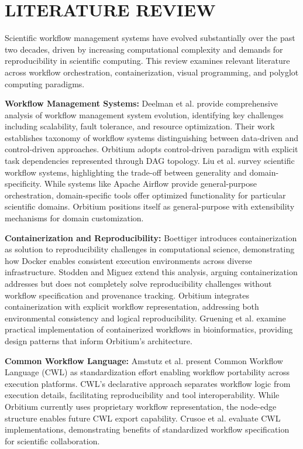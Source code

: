 \documentclass[12pt]{article}
\begin{document}
\newpage
\section{LITERATURE REVIEW}

\hspace{\parindent}Scientific workflow management systems have evolved substantially over the past two decades, driven by increasing computational complexity and demands for reproducibility in scientific computing. This review examines relevant literature across workflow orchestration, containerization, visual programming, and polyglot computing paradigms.

\hspace{\parindent}\textbf{Workflow Management Systems:} Deelman et al. \cite{deelman2015future} provide comprehensive analysis of workflow management system evolution, identifying key challenges including scalability, fault tolerance, and resource optimization. Their work establishes taxonomy of workflow systems distinguishing between data-driven and control-driven approaches. Orbitium adopts control-driven paradigm with explicit task dependencies represented through DAG topology. Liu et al. \cite{liu2015survey} survey scientific workflow systems, highlighting the trade-off between generality and domain-specificity. While systems like Apache Airflow provide general-purpose orchestration, domain-specific tools offer optimized functionality for particular scientific domains. Orbitium positions itself as general-purpose with extensibility mechanisms for domain customization.

\hspace{\parindent}\textbf{Containerization and Reproducibility:} Boettiger \cite{boettiger2015introduction} introduces containerization as solution to reproducibility challenges in computational science, demonstrating how Docker enables consistent execution environments across diverse infrastructure. Stodden and Miguez \cite{stodden2016enhancing} extend this analysis, arguing containerization addresses but does not completely solve reproducibility challenges without workflow specification and provenance tracking. Orbitium integrates containerization with explicit workflow representation, addressing both environmental consistency and logical reproducibility. Gruening et al. \cite{gruening2018practical} examine practical implementation of containerized workflows in bioinformatics, providing design patterns that inform Orbitium's architecture.

\hspace{\parindent}\textbf{Common Workflow Language:} Amstutz et al. \cite{amstutz2016common} present Common Workflow Language (CWL) as standardization effort enabling workflow portability across execution platforms. CWL's declarative approach separates workflow logic from execution details, facilitating reproducibility and tool interoperability. While Orbitium currently uses proprietary workflow representation, the node-edge structure enables future CWL export capability. Crusoe et al. \cite{crusoe2022methods} evaluate CWL implementations, demonstrating benefits of standardized workflow specification for scientific collaboration.
\end{document}
